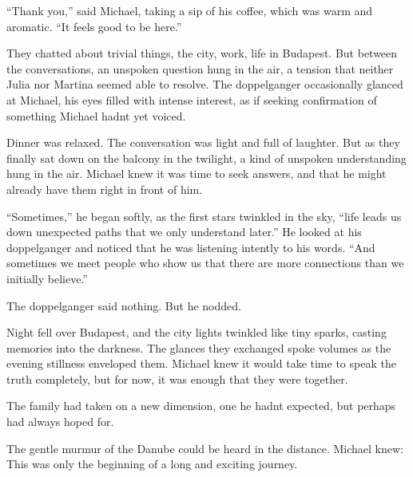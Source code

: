 \documentclass[
]{article}
\begin{document}
``Thank you,'' said Michael, taking a sip of his coffee, which was warm and aromatic. ``It feels good to be here.''



They chatted about trivial things, the city, work, life in Budapest. But between the conversations, an unspoken question hung in the air, a tension that neither Julia nor Martina seemed able to resolve. The doppelganger occasionally glanced at Michael, his eyes filled with intense interest, as if seeking confirmation of something Michael hadn\textquotesingle t yet voiced.

Dinner was relaxed. The conversation was light and full of laughter. But as they finally sat down on the balcony in the twilight, a kind of unspoken understanding hung in the air. Michael knew it was time to seek answers, and that he might already have them right in front of him.

``Sometimes,'' he began softly, as the first stars twinkled in the sky, ``life leads us down unexpected paths that we only understand later.'' He looked at his doppelganger and noticed that he was listening intently to his words. ``And sometimes we meet people who show us that there are more connections than we initially believe.''

The doppelganger said nothing. But he nodded.

Night fell over Budapest, and the city lights twinkled like tiny sparks, casting memories into the darkness. The glances they exchanged spoke volumes as the evening stillness enveloped them. Michael knew it would take time to speak the truth completely, but for now, it was enough that they were together.

The family had taken on a new dimension, one he hadn\textquotesingle t expected, but perhaps had always hoped for.

The gentle murmur of the Danube could be heard in the distance. Michael knew: This was only the beginning of a long and exciting journey.
\end{document}
